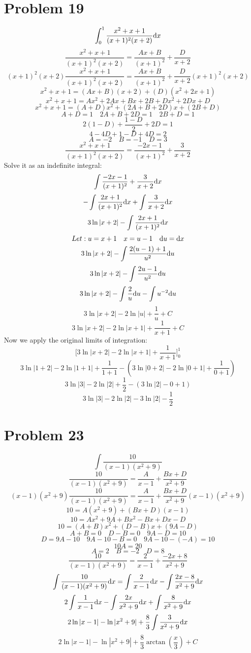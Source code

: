 \documentclass[letterpaper, 12pt]{math}
\begin{document}
\section*{Problem 19}
\[ \int_{0}^{1}{\frac{x^{2}+x+1}{(x+1)^{2}(x+2)}\mathrm{d}{x}} \]
\[ \frac{x^{2}+x+1}{(x+1)^{2}(x+2)} = \frac{Ax+B}{(x+1)^{2}}+\frac{D}{x+2} \]
\[ (x+1)^{2}(x+2)\frac{x^{2}+x+1}{(x+1)^{2}(x+2)} =
   \frac{Ax+B}{(x+1)^{2}}+\frac{D}{x+2}(x+1)^{2}(x+2) \]
\[ x^{2}+x+1 = (Ax+B)(x+2)+(D)(x^{2}+2x+1) \]
\[ x^{2}+x+1 = Ax^{2}+2Ax+Bx+2B+Dx^{2}+2Dx+D \]
\[ x^{2}+x+1 = (A+D)x^{2}+(2A+B+2D)x+(2B+D) \]
\[ A+D = 1 \quad 2A+B+2D = 1 \quad 2B+D = 1 \]
\[ 2(1-D)+\frac{1-D}{2}+2D = 1 \]
\[ 4-4D+1-D+4D = 2 \]
\[ A = -2 \quad B = -1 \quad D = 3 \]
\[ \frac{x^{2}+x+1}{(x+1)^{2}(x+2)} = \frac{-2x-1}{(x+1)^{2}}+\frac{3}{x+2} \]
Solve it as an indefinite integral:
\[ \int{\frac{-2x-1}{(x+1)^{2}}+\frac{3}{x+2}\mathrm{d}{x}} \]
\[ -\int{\frac{2x+1}{(x+1)^{2}}\mathrm{d}{x}}+\int{\frac{3}{x+2}\mathrm{d}{x}} \]
\[ 3\ln|x+2|-\int{\frac{2x+1}{(x+1)^{2}}\mathrm{d}{x}} \]
\[ Let: u = x+1 \quad x = u-1 \quad \mathrm{d}{u}=\mathrm{d}{x} \]
\[ 3\ln|x+2|-\int{\frac{2(u-1)+1}{u^{2}}\mathrm{d}{u}} \]
\[ 3\ln|x+2|-\int{\frac{2u-1}{u^{2}}\mathrm{d}{u}} \]
\[ 3\ln|x+2|-\int{\frac{2}{u}\mathrm{d}{u}}-\int{u^{-2}\mathrm{d}{u}} \]
\[ 3\ln|x+2|-2\ln|u|+\frac{1}{u}+C \]
\[ 3\ln|x+2|-2\ln|x+1|+\frac{1}{x+1}+C \]
Now we apply the original limits of integration:
\[ \bigg[3\ln|x+2|-2\ln|x+1|+\frac{1}{x+1}\bigg]_{0}^{1} \]
\[ 3\ln|1+2|-2\ln|1+1|+\frac{1}{1+1}-(3\ln|0+2|-2\ln|0+1|+\frac{1}{0+1}) \]
\[ 3\ln|3|-2\ln|2|+\frac{1}{2}-(3\ln|2|-0+1) \]
\[ 3\ln|3|-2\ln|2|-3\ln|2|-\frac{1}{2} \]

\section*{Problem 23}
\[ \int{\frac{10}{(x-1)(x^{2}+9)}} \]
\[ \frac{10}{(x-1)(x^{2}+9)} = \frac{A}{x-1}+\frac{Bx+D}{x^{2}+9} \]
\[ (x-1)(x^{2}+9)\frac{10}{(x-1)(x^{2}+9)} =
   \frac{A}{x-1}+\frac{Bx+D}{x^{2}+9}(x-1)(x^{2}+9) \]
\[ 10 = A(x^{2}+9)+(Bx+D)(x-1) \]
\[ 10 = Ax^{2}+9A+Bx^{2}-Bx+Dx-D \]
\[ 10 = (A+B)x^{2}+(D-B)x+(9A-D) \]
\[ A+B = 0 \quad D-B = 0 \quad 9A-D = 10 \]
\[ D = 9A-10 \quad 9A-10-B = 0 \quad 9A-10-(-A) = 10 \]
\[ 10A = 20 \]
\[ A = 2 \quad B = -2 \quad D = 8 \]
\[ \frac{10}{(x-1)(x^{2}+9)} = \frac{2}{x-1}+\frac{-2x+8}{x^{2}+9} \]
\[ \int{\frac{10}{(x-1)(x^{2}+9)}\mathrm{d}{x}} =
   \int{\frac{2}{x-1}\mathrm{d}{x}}-\int{\frac{2x-8}{x^{2}+9}\mathrm{d}{x}} \]
\[ 2\int{\frac{1}{x-1}\mathrm{d}{x}}-\int{\frac{2x}{x^{2}+9}\mathrm{d}{x}}+
   \int{\frac{8}{x^{2}+9}\mathrm{d}{x}} \]
\[ 2\ln|x-1|-\ln|x^{2}+9|+\frac{8}{3}\int{\frac{3}{x^{2}+9}\mathrm{d}{x}} \]
\[ 2\ln|x-1|-\ln|x^{2}+9|+\frac{8}{3}\arctan(\frac{x}{3})+C \]
\end{document}
